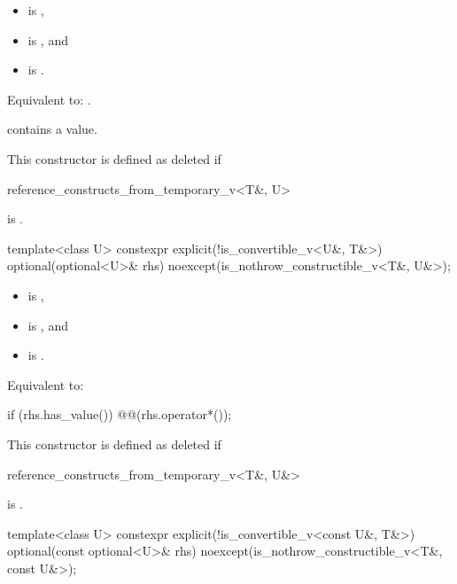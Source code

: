 \begin{itemdescr}
\pnum
\constraints
\begin{itemize}
\item {} is ,
\item {} is , and
\item {} is .
\end{itemize}

\pnum
\effects
Equivalent to: .

\pnum
\ensures
{} contains a value.

\pnum
\remarks
 This constructor is defined as deleted if
\begin{codeblock}
reference_constructs_from_temporary_v<T&, U>
\end{codeblock}
 is .
\end{itemdescr}

\begin{itemdecl}
template<class U>
  constexpr explicit(!is_convertible_v<U&, T&>)
  optional(optional<U>& rhs) noexcept(is_nothrow_constructible_v<T&, U&>);
\end{itemdecl}

\begin{itemdescr}
\pnum
\constraints
\begin{itemize}
\item {} is ,
\item {} is , and
\item {} is .
\end{itemize}

\pnum
\effects
Equivalent to:
\begin{codeblock}
if (rhs.has_value()) @@(rhs.operator*());
\end{codeblock}

\pnum
\remarks
This constructor is defined as deleted if
\begin{codeblock}
reference_constructs_from_temporary_v<T&, U&>
\end{codeblock}
is .
\end{itemdescr}

\begin{itemdecl}
template<class U>
  constexpr explicit(!is_convertible_v<const U&, T&>)
  optional(const optional<U>& rhs) noexcept(is_nothrow_constructible_v<T&, const U&>);
\end{itemdecl}

